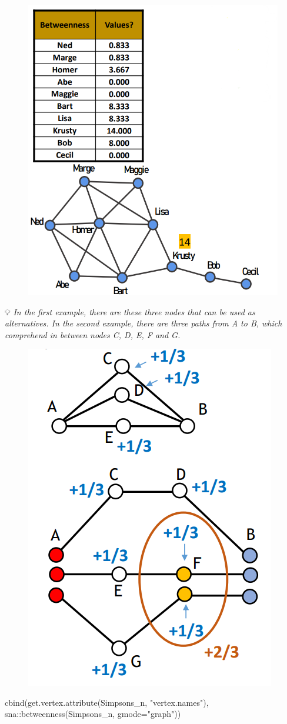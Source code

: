 \documentclass[
  notitlepage,
  onecolumn,
  openany]{book}
\newenvironment{Shaded}{\begin{snugshade}}{\end{snugshade}}
\newcommand{\AttributeTok}[1]{\textcolor[rgb]{0.77,0.63,0.00}{#1}}
\newcommand{\FunctionTok}[1]{\textcolor[rgb]{0.00,0.00,0.00}{#1}}
\newcommand{\NormalTok}[1]{#1}
\newcommand{\SpecialCharTok}[1]{\textcolor[rgb]{0.00,0.00,0.00}{#1}}
\newcommand{\StringTok}[1]{\textcolor[rgb]{0.31,0.60,0.02}{#1}}
\begin{document}
\begin{figure}[h!]

{\centering \includegraphics[width=0.5\linewidth]{images/04-Centrality/Untitled 5} 

}

\end{figure}

💡 \emph{In the first example, there are these three nodes that can be used as alternatives. In the second example, there are three paths from A to B, which comprehend in between nodes C, D, E, F and G.}

\begin{figure}[h!]

{\centering \includegraphics[width=0.3\linewidth]{images/04-Centrality/Untitled 6} 

}

\end{figure}

\begin{Shaded}
\begin{Highlighting}[]
\FunctionTok{cbind}\NormalTok{(}\FunctionTok{get.vertex.attribute}\NormalTok{(Simpsons\_n, }\StringTok{"vertex.names"}\NormalTok{),}
\NormalTok{      sna}\SpecialCharTok{::}\FunctionTok{betweenness}\NormalTok{(Simpsons\_n, }\AttributeTok{gmode=}\StringTok{"graph"}\NormalTok{))}
\end{Highlighting}
\end{Shaded}
\end{document}
